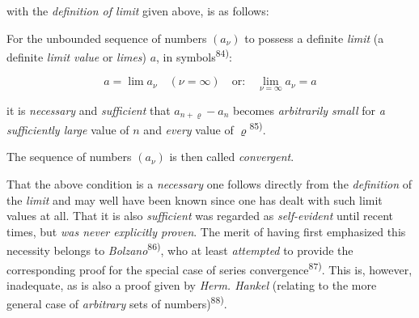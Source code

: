 \thispagestyle{fancy}

\vspace{0.5cm}

with the \textit{definition of limit} given above, is as follows:

For the unbounded sequence of numbers $(a_\nu)$ to possess a definite \textit{limit} (a definite \textit{limit value} or \textit{limes}) $a$, in symbols\textsuperscript{84)}:

$$a = \lim a_\nu \quad (\nu=\infty) \quad \text{or:} \quad \lim_{\nu=\infty} a_\nu = a$$

it is \textit{necessary} and \textit{sufficient} that $a_{n+\varrho} - a_n$ becomes \textit{arbitrarily small} for \textit{a sufficiently large} value of $n$ and \textit{every} value of $\varrho$\textsuperscript{85)}.

The sequence of numbers $(a_\nu)$ is then called \textit{convergent}.

That the above condition is a \textit{necessary} one follows directly from the \textit{definition} of the \textit{limit} and may well have been known since one has dealt with such limit values at all. That it is also \textit{sufficient} was regarded as \textit{self-evident} until recent times, but \textit{was never explicitly proven}. The merit of having first emphasized this necessity belongs to \textit{Bolzano}\textsuperscript{86)}, who at least \textit{attempted} to provide the corresponding proof for the special case of series convergence\textsuperscript{87)}. This is, however, inadequate, as is also a proof given by \textit{Herm. Hankel} (relating to the more general case of \textit{arbitrary} sets of numbers)\textsuperscript{88)}.

